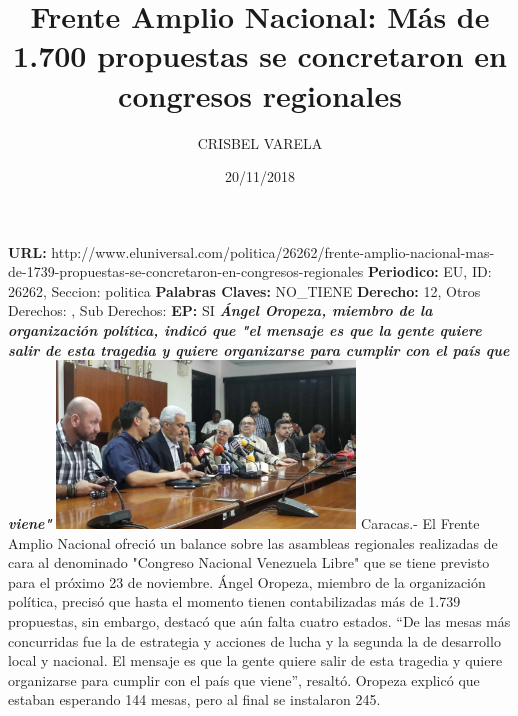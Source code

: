 \documentclass{article}%
\title{\textbf{Frente Amplio Nacional: Más de 1.700 propuestas se concretaron en congresos regionales}}%
\author{CRISBEL VARELA}%
\date{20/11/2018}%
\begin{document}
%
\normalsize%
\maketitle%
\textbf{URL: }%
http://www.eluniversal.com/politica/26262/frente{-}amplio{-}nacional{-}mas{-}de{-}1739{-}propuestas{-}se{-}concretaron{-}en{-}congresos{-}regionales\newline%
%
\textbf{Periodico: }%
EU, %
ID: %
26262, %
Seccion: %
politica\newline%
%
\textbf{Palabras Claves: }%
NO\_TIENE\newline%
%
\textbf{Derecho: }%
12, %
Otros Derechos: %
, %
Sub Derechos: %
\newline%
%
\textbf{EP: }%
SI\newline%
\newline%
%
\textbf{\textit{Ángel Oropeza, miembro de la organización política, indicó que "el mensaje es que la gente quiere salir de esta tragedia y quiere organizarse para cumplir con el país que viene"}}%
\newline%
\newline%
%
\includegraphics[width=300px]{22.jpg}%
\newline%
%
Caracas.{-} El Frente Amplio Nacional ofreció un balance sobre las asambleas regionales realizadas de cara al denominado "Congreso Nacional Venezuela Libre" que se tiene previsto para el próximo 23 de noviembre.%
\newline%
%
Ángel Oropeza, miembro de la organización política, precisó que hasta el momento tienen contabilizadas más de 1.739 propuestas, sin embargo, destacó que aún falta cuatro estados.%
\newline%
%
“De las mesas más concurridas fue la de estrategia y acciones de lucha y la segunda la de desarrollo local y nacional. El mensaje es que la gente quiere salir de esta tragedia y quiere organizarse para cumplir con el país que viene”, resaltó.%
\newline%
%
Oropeza explicó que estaban esperando 144 mesas, pero al final se instalaron 245.%
\newline%
%
\end{document}
